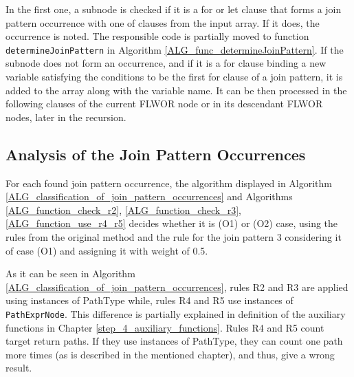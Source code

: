 In the first one, a subnode is checked if it is a for or let clause that forms a join pattern occurrence with one of clauses from the input array. If it does, the occurrence is noted. The responsible code is partially moved to function \texttt{determineJoinPattern} in Algorithm \ref{ALG_func_determineJoinPattern}. If the subnode does not form an occurrence, and if it is a for clause binding a new variable satisfying the conditions to be the first for clause of a join pattern, it is added to the array along with the variable name. It can be then processed in the following clauses of the current FLWOR node or in its descendant FLWOR nodes, later in the recursion.

\subsection{Analysis of the Join Pattern Occurrences}
For each found join pattern occurrence, the algorithm displayed in Algorithm \ref{ALG_classification_of_join_pattern_occurrences} and Algorithms \ref{ALG_function_check_r2}, \ref{ALG_function_check_r3}, \ref{ALG_function_use_r4_r5} decides whether it is (O1) or (O2) case, using the rules from the original method and the rule for the join pattern 3 considering it of case (O1) and assigning it with weight of 0.5.

As it can be seen in Algorithm \ref{ALG_classification_of_join_pattern_occurrences}, rules R2 and R3 are applied using instances of PathType while, rules R4 and R5 use instances of \texttt{PathExprNode}. This difference is partially explained in definition of the auxiliary functions in Chapter \ref{step_4_auxiliary_functions}. Rules R4 and R5 count target return paths. If they use instances of PathType, they can count one path more times (as is described in the mentioned chapter), and thus, give a wrong result.

